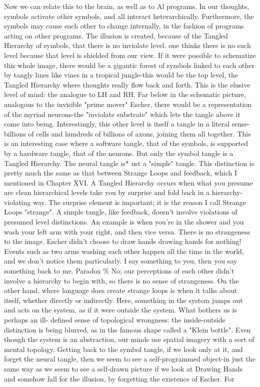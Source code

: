 Now we can relate this to the brain, as well as to Al programs. In our thoughts, symbols
activate other symbols, and all interact heterarchically. Furthermore, the symbols may
cause each other to change internally, in the fashion of programs acting on other
programs. The illusion is created, because of the Tangled Hierarchy of symbols, that
there is no inviolate level. one thinks there is no such level because that level is shielded
from our view.
        If it were possible to schematize this whole image, there would be a gigantic
forest of symbols linked to each other by tangly lines like vines in a tropical jungle-this
would be the top level, the Tangled Hierarchy where thoughts really flow back and forth.
This is the elusive level of mind: the analogue to LH and RH. Far below in the schematic
picture, analogous to the invisible "prime mover" Escher, there would be a representation
of the myriad neurons-the "inviolate substrate" which lets the tangle above it come into
being. Interestingly, this other level is itself a tangle in a literal sense-billions of cells and
hundreds of billions of axons, joining them all together.
        This is an interesting case where a software tangle, that of the symbols, is
supported by a hardware tangle, that of the neurons. But only the symbol tangle is a
Tangled Hierarchy. The neural tangle is* ust a "simple" tangle. This distinction is pretty
much the same as that between Strange Loops and feedback, which I mentioned in
Chapter XVI. A Tangled Hierarchy occurs when what you presume are clean hierarchical
levels take you by surprise and fold back in a hierarchy-violating way. The surprise
element is important; it is the reason I call Strange Loops "strange". A simple tangle, like
feedback, doesn't involve violations of presumed level distinctions. An example is when
you're in the shower and you wash your left arm with your right, and then vice versa.
There is no strangeness to the image. Escher didn't choose to draw hands drawing hands
for nothing!
        Events such as two arms washing each other happen all the time in the world, and
we don't notice them particularly. I say something to you, then you say something back to
me. Paradox \% No; our perceptions of each other didn't involve a hierarchy to begin with,
so there is no sense of strangeness.
        On the other hand, where language does create strange loops is when it talks
about itself, whether directly or indirectly. Here, something in the system jumps out and
acts on the system, as if it were outside the system. What bothers us is perhaps an ill-
defined sense of topological wrongness: the inside-outside distinction is being blurred, as
in the famous shape called a "Klein bottle". Even though the system is an abstraction, our
minds use spatial imagery with a sort of mental topology.
        Getting back to the symbol tangle, if we look only at it, and forget the neural
tangle, then we seem to see a self-programmed object-in just the same way as we seem to
see a self-drawn picture if we look at Drawing Hands and somehow fall for the illusion,
by forgetting the existence of Escher. For




